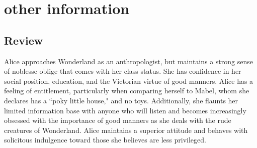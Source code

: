 \documentclass[letterpaper]{twentysecondcv} %
\begin{document}





\section{other information}

\subsection{Review}

Alice approaches Wonderland as an anthropologist, but maintains a strong sense of noblesse oblige that comes with her class status. She has confidence in her social position, education, and the Victorian virtue of good manners. Alice has a feeling of entitlement, particularly when comparing herself to Mabel, whom she declares has a ``poky little house," and no toys. Additionally, she flaunts her limited information base with anyone who will listen and becomes increasingly obsessed with the importance of good manners as she deals with the rude creatures of Wonderland. Alice maintains a superior attitude and behaves with solicitous indulgence toward those she believes are less privileged.





\end{document}
